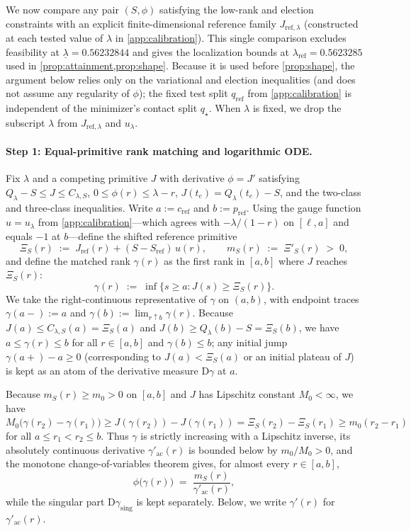 \documentclass[11pt]{article}
\numberwithin{equation}{section}
\theoremstyle{plain}
\theoremstyle{definition}
\newcommand{\1}{\mathbf{1}}
\begin{document}
We now compare any pair $(S, \phi)$ satisfying the low-rank and election constraints with an explicit finite-dimensional reference family $J_{\mathrm{ref}, \lambda}$ (constructed at each tested value of $\lambda$ in \cref{app:calibration}). This single comparison excludes feasibility at $\underline{\lambda} = 0.56232844$ and gives the localization bounds at $\lambda_{\mathrm{ref}} = 0.5623285$ used in \cref{prop:attainment,prop:shape}. Because it is used before \cref{prop:shape}, the argument below relies only on the variational and election inequalities (and does not assume any regularity of $\phi$); the fixed test split $q_{\mathrm{ref}}$ from \cref{app:calibration} is independent of the minimizer's contact split $q_\star$. When $\lambda$ is fixed, we drop the subscript $\lambda$ from $J_{\mathrm{ref}, \lambda}$ and $u_\lambda$.

\paragraph{Step 1: Equal-primitive rank matching and logarithmic ODE.}
Fix $\lambda$ and a competing primitive $J$ with derivative $\phi = J'$ satisfying $Q_\lambda - S \le J \le C_{\lambda, S}$, $0 \le \phi(r) \le \lambda - r$, $J(t_e) = Q_\lambda(t_e) - S$, and the two-class and three-class inequalities. Write $a := c_{\mathrm{ref}}$ and $b := p_{\mathrm{ref}}$. Using the gauge function $u = u_\lambda$ from \cref{app:calibration}---which agrees with $-\lambda/(1 - r)$ on $[\ell, a]$ and equals $-1$ at $b$---define the shifted reference primitive
\[
  \Xi_S(r) \;:=\; J_{\mathrm{ref}}(r) + (S - S_{\mathrm{ref}})\,u(r),
  \qquad
  m_S(r) \;:=\; \Xi'_S(r) \;>\; 0,
\]
and define the matched rank $\gamma(r)$ as the first rank in $[a, b]$ where $J$ reaches $\Xi_S(r)$:
\[
  \gamma(r) \;:=\; \inf\bigl\{s \ge a : J(s) \ge \Xi_S(r)\bigr\}.
\]
We take the right-continuous representative of $\gamma$ on $(a, b)$, with endpoint traces $\gamma(a-) := a$ and $\gamma(b) := \lim_{r \uparrow b} \gamma(r)$. Because $J(a) \le C_{\lambda, S}(a) = \Xi_S(a)$ and $J(b) \ge Q_\lambda(b) - S = \Xi_S(b)$, we have $a \le \gamma(r) \le b$ for all $r \in [a, b]$ and $\gamma(b) \le b$; any initial jump $\gamma(a+) - a \ge 0$ (corresponding to $J(a) < \Xi_S(a)$ or an initial plateau of $J$) is kept as an atom of the derivative measure $\mathrm{D}\gamma$ at $a$.

Because $m_S(r) \ge m_0 > 0$ on $[a, b]$ and $J$ has Lipschitz constant $M_0 < \infty$, we have $M_0\bigl(\gamma(r_2) - \gamma(r_1)\bigr) \ge J(\gamma(r_2)) - J(\gamma(r_1)) = \Xi_S(r_2) - \Xi_S(r_1) \ge m_0(r_2 - r_1)$ for all $a \le r_1 < r_2 \le b$. Thus $\gamma$ is strictly increasing with a Lipschitz inverse, its absolutely continuous derivative $\gamma'_{\mathrm{ac}}(r)$ is bounded below by $m_0/M_0 > 0$, and the monotone change-of-variables theorem gives, for almost every $r \in [a, b]$,
\begin{equation}
  \phi\bigl(\gamma(r)\bigr) \;=\; \frac{m_S(r)}{\gamma'_{\mathrm{ac}}(r)},
  \label{eq:reciprocal-score}
\end{equation}
while the singular part $\mathrm{D}\gamma_{\mathrm{sing}}$ is kept separately. Below, we write $\gamma'(r)$ for $\gamma'_{\mathrm{ac}}(r)$.
\end{document}
